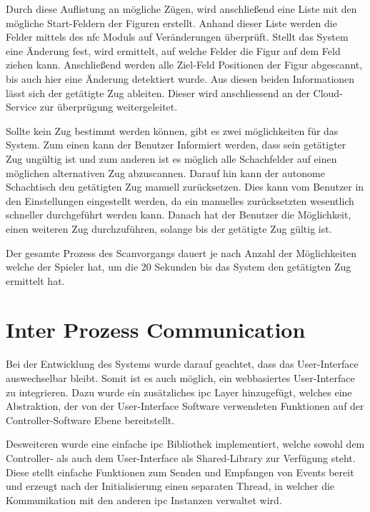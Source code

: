 Durch diese Auflistung an mögliche Zügen, wird anschließend eine Liste
mit den mögliche Start-Feldern der Figuren erstellt. Anhand dieser Liste
werden die Felder mittels des \gls{nfc} Moduls auf Veränderungen
überprüft. Stellt das System eine Änderung fest, wird ermittelt, auf
welche Felder die Figur auf dem Feld ziehen kann. Anschließend werden
alle Ziel-Feld Positionen der Figur abgescannt, bis auch hier eine
Änderung detektiert wurde. Aus diesen beiden Informationen lässt sich
der getätigte Zug ableiten. Dieser wird anschliessend an der
Cloud-Service zur überprügung weitergeleitet.

Sollte kein Zug bestimmt werden können, gibt es zwei möglichkeiten für
das System. Zum einen kann der Benutzer Informiert werden, dass sein
getätigter Zug ungültig ist und zum anderen ist es möglich alle
Schachfelder auf einen möglichen alternativen Zug abzuscannen. Darauf
hin kann der autonome Schachtisch den getätigten Zug manuell
zurücksetzen. Dies kann vom Benutzer in den Einstellungen eingestellt
werden, da ein manuelles zurücksetzten wesentlich schneller durchgeführt
werden kann. Danach hat der Benutzer die Möglichkeit, einen weiteren Zug
durchzuführen, solange bis der getätigte Zug gültig ist.

Der gesamte Prozess des Scanvorgangs dauert je nach Anzahl der
Möglichkeiten welche der Spieler hat, um die 20 Sekunden bis das System
den getätigten Zug ermittelt hat.

\hypertarget{inter-prozess-communication}{%
\section{Inter Prozess
Communication}\label{inter-prozess-communication}}

Bei der Entwicklung des Systems wurde darauf geachtet, dass das
User-Interface auswechselbar bleibt. Somit ist es auch möglich, ein
webbasiertes User-Interface zu integrieren. Dazu wurde ein zusätzliches
\gls{ipc} Layer hinzugefügt, welches eine Abstraktion, der von der
User-Interface Software verwendeten Funktionen auf der
Controller-Software Ebene bereitstellt.

Desweiteren wurde eine einfache \gls{ipc} Bibliothek implementiert,
welche sowohl dem Controller- als auch dem User-Interface als
Shared-Library zur Verfügung steht. Diese stellt einfache Funktionen zum
Senden und Empfangen von Events bereit und erzeugt nach der
Initialisierung einen separaten Thread, in welcher die Kommunikation mit
den anderen \gls{ipc} Instanzen verwaltet wird.

